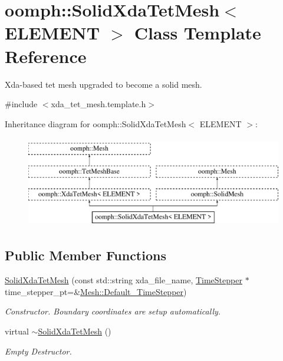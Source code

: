 \hypertarget{classoomph_1_1SolidXdaTetMesh}{}\section{oomph\+:\+:Solid\+Xda\+Tet\+Mesh$<$ E\+L\+E\+M\+E\+NT $>$ Class Template Reference}
\label{classoomph_1_1SolidXdaTetMesh}


Xda-\/based tet mesh upgraded to become a solid mesh.  




{\ttfamily \#include $<$xda\+\_\+tet\+\_\+mesh.\+template.\+h$>$}

Inheritance diagram for oomph\+:\+:Solid\+Xda\+Tet\+Mesh$<$ E\+L\+E\+M\+E\+NT $>$\+:\begin{figure}[H]
\begin{center}
\leavevmode
\includegraphics[height=4.000000cm]{classoomph_1_1SolidXdaTetMesh}
\end{center}
\end{figure}
\subsection*{Public Member Functions}
\begin{DoxyCompactItemize}
\item 
\hyperlink{classoomph_1_1SolidXdaTetMesh_a1242b23a2df9f424ec17aa2059ba116d}{Solid\+Xda\+Tet\+Mesh} (const std\+::string xda\+\_\+file\+\_\+name, \hyperlink{classoomph_1_1TimeStepper}{Time\+Stepper} $\ast$time\+\_\+stepper\+\_\+pt=\&\hyperlink{classoomph_1_1Mesh_a12243d0fee2b1fcee729ee5a4777ea10}{Mesh\+::\+Default\+\_\+\+Time\+Stepper})
\begin{DoxyCompactList}\small\item\em Constructor. Boundary coordinates are setup automatically. \end{DoxyCompactList}\item 
virtual \hyperlink{classoomph_1_1SolidXdaTetMesh_a9425d53bae183deb23fb3a1019a48ca8}{$\sim$\+Solid\+Xda\+Tet\+Mesh} ()
\begin{DoxyCompactList}\small\item\em Empty Destructor. \end{DoxyCompactList}\end{DoxyCompactItemize}
